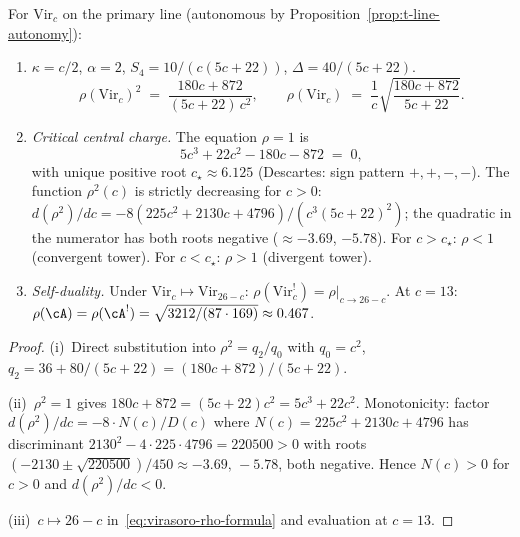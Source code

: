 \begin{corollary}
\label{cor:virasoro-shadow-radius}
\ClaimStatusProvedHere
{}
For $\mathrm{Vir}_c$ on the primary line
\textup{(}autonomous by
Proposition~\textup{\ref{prop:t-line-autonomy}}):
\begin{enumerate}[label=\textup{(\roman*)}]
\item
  $\kappa = c/2$, $\alpha = 2$,
  $S_4 = 10/(c(5c{+}22))$, $\Delta = 40/(5c{+}22)$.
  \begin{equation}\label{eq:virasoro-rho-formula}
    \rho(\mathrm{Vir}_c)^2
    \;=\;
    \frac{180c + 872}{(5c{+}22)\,c^2},
    \qquad
    \rho(\mathrm{Vir}_c)
    \;=\;
    \frac{1}{c}\sqrt{\frac{180c + 872}{5c{+}22}}.
  \end{equation}

\item \emph{Critical central charge.}\enspace
  The equation $\rho = 1$ is
  \begin{equation}\label{eq:critical-cubic}
    5c^3 + 22c^2 - 180c - 872 \;=\; 0,
  \end{equation}
  with unique positive root $c_\star \approx 6.125$
  \textup{(}Descartes: sign pattern
  $+,+,-,-$\textup{)}.
  The function $\rho^2(c)$ is strictly
  decreasing for $c > 0$:
  $d(\rho^2)/dc =
  -8(225c^2{+}2130c{+}4796)/(c^3(5c{+}22)^2)$;
  the quadratic in the numerator has both roots
  negative ($\approx -3.69$, $-5.78$).
  For $c > c_\star$: $\rho < 1$
  \textup{(}convergent tower\textup{)}.
  For $c < c_\star$: $\rho > 1$
  \textup{(}divergent tower\textup{)}.

\item \emph{Self-duality.}\enspace
  Under $\mathrm{Vir}_c \mapsto \mathrm{Vir}_{26-c}$:
  $\rho(\mathrm{Vir}_c^!) = \rho\big|_{c \to 26-c}$.
  At $c = 13$:
  $\rho(\cA) = \rho(\cA^!) =
  \sqrt{3212/(87 \cdot 169)} \approx 0.467$.
\end{enumerate}
\end{corollary}

\begin{proof}
(i)~Direct substitution into $\rho^2 = q_2/q_0$
with $q_0 = c^2$,
$q_2 = 36 + 80/(5c{+}22) = (180c{+}872)/(5c{+}22)$.

(ii)~$\rho^2 = 1$ gives $180c+872 = (5c{+}22)c^2
= 5c^3 + 22c^2$.  Monotonicity: factor
$d(\rho^2)/dc = -8 \cdot N(c)/D(c)$ where
$N(c) = 225c^2 + 2130c + 4796$ has discriminant
$2130^2 - 4 \cdot 225 \cdot 4796 = 220500 > 0$ with roots
$(-2130 \pm \sqrt{220500})/450 \approx -3.69,\, -5.78$,
both negative.
Hence $N(c) > 0$ for $c > 0$ and $d(\rho^2)/dc < 0$.

(iii)~$c \mapsto 26-c$ in~\eqref{eq:virasoro-rho-formula}
and evaluation at $c = 13$.
\end{proof}

